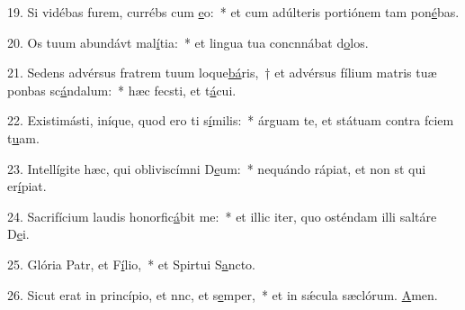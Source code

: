 19. Si vidébas furem, currébs cum \uline{e}o:~* et cum adúlteris portiónem tam pon\uline{é}bas.\par 
20. Os tuum abundávt mal\uline{í}tia:~* et lingua tua concnnábat d\uline{o}los.\par 
21. Sedens advérsus fratrem tuum loque\uline{bá}ris,~† et advérsus fílium matris tuæ ponbas sc\uline{á}ndalum:~* hæc fecsti, et t\uline{á}cui.\par 
22. Existimásti, iníque, quod ero ti s\uline{í}milis:~* árguam te, et státuam contra fciem t\uline{u}am.\par 
23. Intellígite hæc, qui obliviscímni D\uline{e}um:~* nequándo rápiat, et non st qui er\uline{í}piat.\par 
24. Sacrifícium laudis honorfic\uline{á}bit me:~* et illic iter, quo osténdam illi saltáre D\uline{e}i.\par 
25. Glória Patr, et F\uline{í}lio,~* et Spirtui S\uline{a}ncto.\par 
26. Sicut erat in princípio, et nnc, et s\uline{e}mper,~* et in sǽcula sæclórum. \uline{A}men.\par 
